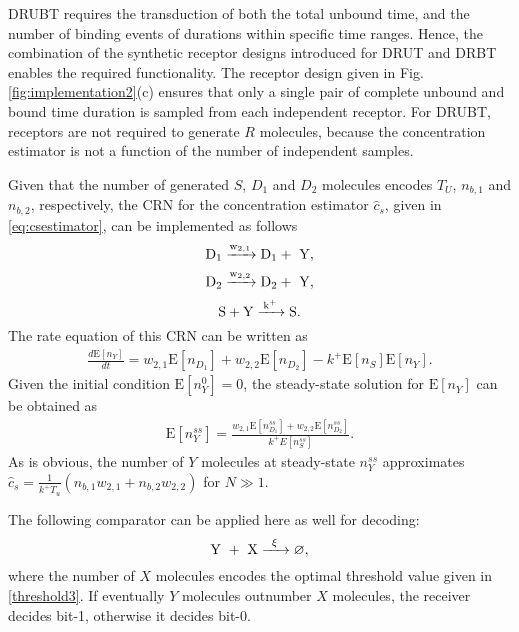 \documentclass[twocolumn]{IEEEtran}
\newcommand{\E}{\mathrm{E}}
\begin{document}
DRUBT requires the transduction of both the total unbound time, and the number of binding events of durations within specific time ranges. Hence, the combination of the synthetic receptor designs introduced for DRUT and DRBT enables the required functionality. The receptor design given in Fig. \ref{fig:implementation2}(c) ensures that only a single pair of complete unbound and bound time duration is sampled from each independent receptor. For DRUBT, receptors are not required to generate $R$ molecules, because the concentration estimator is not a function of the number of independent samples.

Given that the number of generated $S$, $D_1$ and $D_2$ molecules encodes $T_U$, $n_{b,1}$ and $n_{b,2}$, respectively, the CRN for the concentration estimator $\hat{c}_s$, given in \eqref{eq:csestimator}, can be implemented as follows 
\begin{equation}
\ce{ {D_1} ->[{w_{2,1}}] {D_1} + { Y} },
\end{equation}
\begin{equation}
\ce{ {D_2} ->[{w_{2,2}}] {D_2} + { Y} },
\end{equation}
\begin{equation}
\ce{ {S} + {Y} ->[{k^+}] S }.
\end{equation}
The rate equation of this CRN can be written as
\begin{align}
\frac{d\E[ n_{Y}] }{dt} = w_{2,1} \E[n_{D_1}] + w_{2,2} \E[n_{D_2}] -  k^+ \E[n_{S}]  \E[ n_{Y}].
\end{align}
Given the initial condition $\E[ n_{Y}^0] = 0$, the steady-state solution for $\E[ n_{Y}]$ can be obtained as
\begin{align}
\E[ n_{Y}^{ss}] = \frac{w_{2,1} \E[n_{D_1}^{ss}] + w_{2,2} \E[n_{D_2}^{ss}] }{k^+ E[n_{S}^{ss}]}. 
\end{align}
As is obvious, the number of $Y$ molecules at steady-state $n_{Y}^{ss}$ approximates $\hat{c}_s =  \frac{1}{k^+ T_u}  \left( n_{b,1} w_{2,1} + n_{b,2} w_{2,2} \right)$ for  $N \gg 1$.


The following comparator can be applied here as well for decoding:  
\begin{equation}
\ce{ {Y + X} ->[{\xi}] {\varnothing} },
\end{equation}
where the number of $X$ molecules encodes the optimal threshold value given in \eqref{threshold3}. If eventually $Y$ molecules outnumber $X$ molecules, the receiver decides bit-1, otherwise it decides bit-0.
\end{document}
